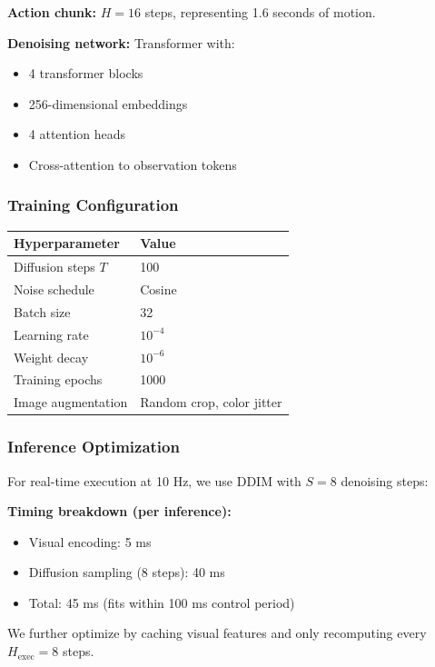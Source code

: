 \textbf{Action chunk:} $H = 16$ steps, representing 1.6 seconds of motion.

\textbf{Denoising network:} Transformer with:
\begin{itemize}
    \item 4 transformer blocks
    \item 256-dimensional embeddings
    \item 4 attention heads
    \item Cross-attention to observation tokens
\end{itemize}

\subsubsection{Training Configuration}

\begin{center}
\begin{tabular}{ll}
\toprule
\textbf{Hyperparameter} & \textbf{Value} \\
\midrule
Diffusion steps $T$ & 100 \\
Noise schedule & Cosine \\
Batch size & 32 \\
Learning rate & $10^{-4}$ \\
Weight decay & $10^{-6}$ \\
Training epochs & 1000 \\
Image augmentation & Random crop, color jitter \\
\bottomrule
\end{tabular}
\end{center}

\subsubsection{Inference Optimization}

For real-time execution at 10 Hz, we use DDIM with $S = 8$ denoising steps:

\textbf{Timing breakdown (per inference):}
\begin{itemize}
    \item Visual encoding: 5 ms
    \item Diffusion sampling (8 steps): 40 ms
    \item Total: 45 ms (fits within 100 ms control period)
\end{itemize}

We further optimize by caching visual features and only recomputing every $H_{\text{exec}} = 8$ steps.

